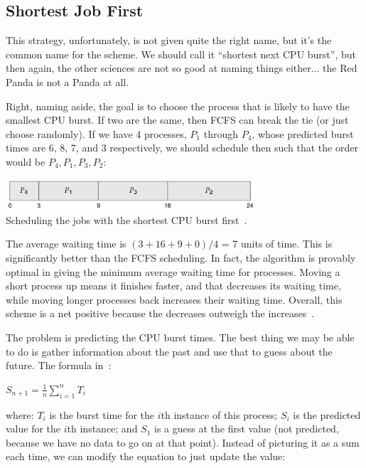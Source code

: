 \subsection*{Shortest Job First}
This strategy, unfortunately, is not given quite the right name, but it's the common name for the scheme. We should call it ``shortest next CPU burst'', but then again, the other sciences are not so good at naming things either... the Red Panda is not a Panda at all.

Right, naming aside, the goal is to choose the process that is likely to have the smallest CPU burst. If two are the same, then FCFS can break the tie (or just choose randomly).  If we have 4 processes, $P_{1}$ through $P_{4}$, whose predicted burst times are 6, 8, 7, and 3 respectively, we should schedule then such that the order would be $P_{4}, P_{1}, P_{3}, P_{2}$:

\begin{center}
\includegraphics[width=0.7\textwidth]{images/sjf.png}\\
Scheduling the jobs with the shortest CPU burst first~\cite{osc}.
\end{center}

The average waiting time is $(3 + 16 + 9 + 0) / 4$ = 7 units of time. This is significantly better than the FCFS scheduling. In fact, the algorithm is provably optimal in giving the minimum average waiting time for processes. Moving a short process up means it finishes faster, and that decreases its waiting time, while moving longer processes back increases their waiting time. Overall, this scheme is a net positive because the decreases outweigh the increases~\cite{osc}.

The problem is predicting the CPU burst times. The best thing we may be able to do is gather information about the past and use that to guess about the future. The formula in~\cite{osi}:

\begin{center}
$S_{n+1} = \frac{1}{n}\displaystyle\sum_{i=1}^{n}T_{i}$
\end{center}

where: $T_{i}$ is the burst time for the $i$th instance of this process; $S_{i}$ is the predicted value for the $i$th instance; and $S_{1}$ is a guess at the first value (not predicted, because we have no data to go on at that point). Instead of picturing it as a sum each time, we can modify the equation to just update the value:

